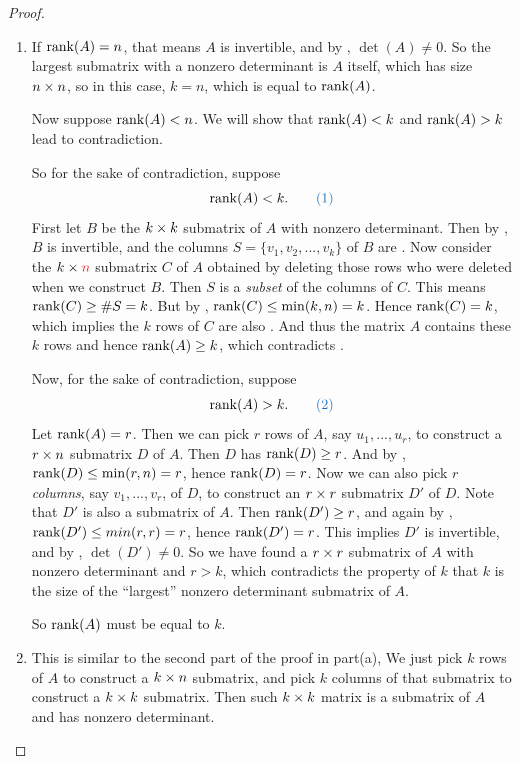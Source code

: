 \begin{proof} \ 

\begin{enumerate}
\item
If \(\mathrm{rank}(A) = n\), that means \(A\) is invertible, and by , \(\det(A) \ne 0\).
So the largest submatrix with a nonzero determinant is \(A\) itself, which has size \(n \times n\), so in this case, \(k = n\), which is equal to \(\mathrm{rank}(A)\).

Now suppose \(\mathrm{rank}(A) < n\).
We will show that \(\mathrm{rank}(A) < k\) and \(\mathrm{rank}(A) > k\) lead to contradiction.

So for the sake of contradiction, suppose
\[
    \rank(A) < k. \quad \quad \BLUE{(1)}
\]
First let \(B\) be the \(k \times k\) submatrix of \(A\) with nonzero determinant.
Then by , \(B\) is invertible, and the columns \(S = \{ v_1, v_2, ..., v_k \}\) of \(B\) are \LID{}.
Now consider the \(k \X \RED{n}\) submatrix \(C\) of \(A\) obtained by deleting those rows who were deleted when we construct \(B\).
Then \(S\) is a \emph{subset} of the columns of \(C\).
This means \(\mathrm{rank}(C) \ge \#S = k\).
But by , \(\mathrm{rank}(C) \le \min(k, n) = k\).
Hence \(\mathrm{rank}(C) = k\), which implies the \(k\) rows of \(C\) are also \LID{}.
And thus the matrix \(A\) contains these \(k\) \LID{} rows and hence \(\mathrm{rank}(A) \ge k\), which contradicts .

Now, for the sake of contradiction, suppose
\[
    \rank(A) > k. \quad \quad \BLUE{(2)}
\]
Let \(\mathrm{rank}(A) = r\).
Then we can pick \(r\) \LID{} rows of \(A\), say \(u_1, ..., u_r\), to construct a \(r \times n\) submatrix \(D\) of \(A\).
Then \(D\) has \(\mathrm{rank}(D) \ge r\).
And by , \(\mathrm{rank}(D) \le \min(r, n) = r\), hence \(\mathrm{rank}(D) = r\).
Now we can also pick \(r\) \LID{} \emph{columns}, say \(v_1, ..., v_r\), of \(D\), to construct an \(r \times r\) submatrix \(D'\) of \(D\).
Note that \(D'\) is also a submatrix of \(A\).
Then \(\mathrm{rank}(D') \ge r\), and again by , \(\mathrm{rank}(D') \le min(r, r) = r\), hence \(\mathrm{rank}(D') = r\).
This implies \(D'\) is invertible, and by , \(\det(D') \ne 0\).
So we have found a \(r \times r\) submatrix of \(A\) with nonzero determinant and \(r > k\), which contradicts the property of \(k\) that \(k\) is the size of the ``largest'' nonzero determinant submatrix of \(A\).

So \(\mathrm{rank}(A)\) must be equal to \(k\).

\item This is similar to the second part of the proof in part(a),
We just pick \(k\) \LID{} rows of \(A\) to construct a \(k \times n\) submatrix, and pick \LID{} \(k\) columns of that submatrix to construct a \(k \times k\) submatrix.
Then such \(k \times k\) matrix is a submatrix of \(A\) and has nonzero determinant.
\end{enumerate}
\end{proof}

